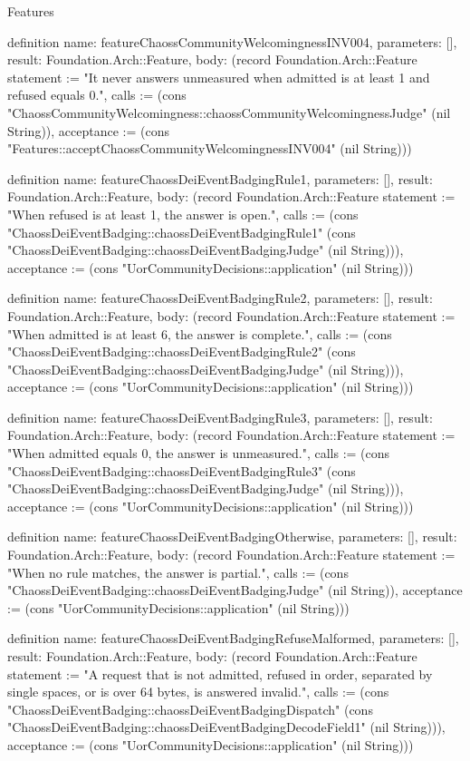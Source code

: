 \begin{lexlean}{Features}
\begin{semanticmodule}
definition{
  name: featureChaossCommunityWelcomingnessINV004,
  parameters: [],
  result: Foundation.Arch::Feature,
  body: (record Foundation.Arch::Feature {statement := "It never answers unmeasured when admitted is at least 1 and refused equals 0.", calls := (cons "ChaossCommunityWelcomingness::chaossCommunityWelcomingnessJudge" (nil String)), acceptance := (cons "Features::acceptChaossCommunityWelcomingnessINV004" (nil String))})
}

definition{
  name: featureChaossDeiEventBadgingRule1,
  parameters: [],
  result: Foundation.Arch::Feature,
  body: (record Foundation.Arch::Feature {statement := "When refused is at least 1, the answer is open.", calls := (cons "ChaossDeiEventBadging::chaossDeiEventBadgingRule1" (cons "ChaossDeiEventBadging::chaossDeiEventBadgingJudge" (nil String))), acceptance := (cons "UorCommunityDecisions::application" (nil String))})
}

definition{
  name: featureChaossDeiEventBadgingRule2,
  parameters: [],
  result: Foundation.Arch::Feature,
  body: (record Foundation.Arch::Feature {statement := "When admitted is at least 6, the answer is complete.", calls := (cons "ChaossDeiEventBadging::chaossDeiEventBadgingRule2" (cons "ChaossDeiEventBadging::chaossDeiEventBadgingJudge" (nil String))), acceptance := (cons "UorCommunityDecisions::application" (nil String))})
}

definition{
  name: featureChaossDeiEventBadgingRule3,
  parameters: [],
  result: Foundation.Arch::Feature,
  body: (record Foundation.Arch::Feature {statement := "When admitted equals 0, the answer is unmeasured.", calls := (cons "ChaossDeiEventBadging::chaossDeiEventBadgingRule3" (cons "ChaossDeiEventBadging::chaossDeiEventBadgingJudge" (nil String))), acceptance := (cons "UorCommunityDecisions::application" (nil String))})
}

definition{
  name: featureChaossDeiEventBadgingOtherwise,
  parameters: [],
  result: Foundation.Arch::Feature,
  body: (record Foundation.Arch::Feature {statement := "When no rule matches, the answer is partial.", calls := (cons "ChaossDeiEventBadging::chaossDeiEventBadgingJudge" (nil String)), acceptance := (cons "UorCommunityDecisions::application" (nil String))})
}

definition{
  name: featureChaossDeiEventBadgingRefuseMalformed,
  parameters: [],
  result: Foundation.Arch::Feature,
  body: (record Foundation.Arch::Feature {statement := "A request that is not admitted, refused in order, separated by single spaces, or is over 64 bytes, is answered invalid.", calls := (cons "ChaossDeiEventBadging::chaossDeiEventBadgingDispatch" (cons "ChaossDeiEventBadging::chaossDeiEventBadgingDecodeField1" (nil String))), acceptance := (cons "UorCommunityDecisions::application" (nil String))})
}


\end{semanticmodule}
\end{lexlean}
